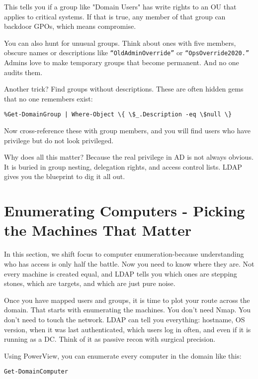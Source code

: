 This tells you if a group like "Domain Users" has write rights to an OU that applies to critical systems. If that is true, any member of that group can backdoor GPOs, which means compromise.

You can also hunt for unusual groups. Think about ones with five members, obscure names or descriptions like \texttt{“OldAdminOverride”} or \texttt{“OpsOverride2020.”} Admins love to make temporary groups that become permanent. And no one audits them.

Another trick? Find groups without descriptions. These are often hidden gems that no one remembers exist:

\begin{verbatim}
%Get-DomainGroup | Where-Object \{ \$_.Description -eq \$null \}
\end{verbatim}

Now cross-reference these with group members, and you will find users who have privilege but do not look privileged.

Why does all this matter? Because the real privilege in AD is not always obvious. It is buried in group nesting, delegation rights, and access control lists. LDAP gives you the blueprint to dig it all out.

\section{Enumerating Computers - Picking the Machines That Matter}

In this section, we shift focus to computer enumeration-because understanding who has access is only half the battle. Now you need to know where they are. Not every machine is created equal, and LDAP tells you which ones are stepping stones, which are targets, and which are just pure noise.

Once you have mapped users and groups, it is time to plot your route across the domain. That starts with enumerating the machines. You don’t need Nmap. You don’t need to touch the network. LDAP can tell you everything: hostname, OS version, when it was last authenticated, which users log in often, and even if it is running as a DC. Think of it as passive recon with surgical precision.

Using PowerView, you can enumerate every computer in the domain like this:

\begin{verbatim}
Get-DomainComputer
\end{verbatim}

